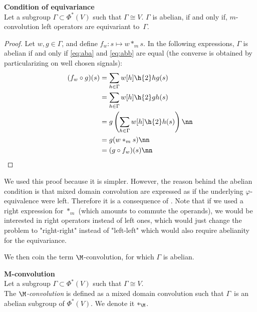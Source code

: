 \begin{proposition}\textbf{Condition of equivariance}\\
Let a subgroup $\Gamma \subset \Phi^*(V)$ such that $\Gamma \cong V$. $\Gamma$ is abelian, if and only if, $m$-convolution left operators are equivariant to~$\Gamma$.
\label{prop:equiM}
\end{proposition}
\begin{proof}
Let $w, g \in \Gamma$, and define $f_w: s \mapsto w \ast_m s$. In the following expressions, $\Gamma$ is abelian if and only if \eqref{eq:aba} and \eqref{eq:abb} are equal (the converse is obtained by particularizing on well chosen signals):
\begin{align}
(f_w \circ g) (s) & = \displaystyle \sum_{h \in \Gamma} w[h] \h{2} hg(s) \label{eq:aba}\\
 & = \displaystyle \sum_{h \in \Gamma} w[h] \h{2} gh(s) \label{eq:abb}\\
 & = \displaystyle g\left(\sum_{h \in \Gamma} w[h] \h{2} h(s)\right) \nn\\
 & = g(w \ast_m s ) \nn\\
 & = (g \circ f_w) (s) \nn
\end{align}
\end{proof}

\begin{remark}
We used this proof because it is simpler. However, the reason behind the abelian condition is that mixed domain convolution are expressed as if the underlying $\varphi$-equivalence were left. Therefore it is a consequence of . Note that if we used a right expression for $\ast_m$ (which amounts to commute the operands), we would be interested in right operators instead of left ones, which would just change the problem to "right-right" instead of "left-left" which would also require abelianity for the equivariance.
\end{remark}

We then coin the term $\M$-convolution, for which $\Gamma$ is abelian.

\begin{definition}\textbf{M-convolution}\\
Let a subgroup $\Gamma \subset \Phi^*(V)$ such that $\Gamma \cong V$.\\
The \emph{$\M$-convolution} is defined as a mixed domain convolution such that $\Gamma$~is an abelian subgroup of $\Phi^*(V)$.
We denote it $\ast_{\M}$.
\end{definition}

